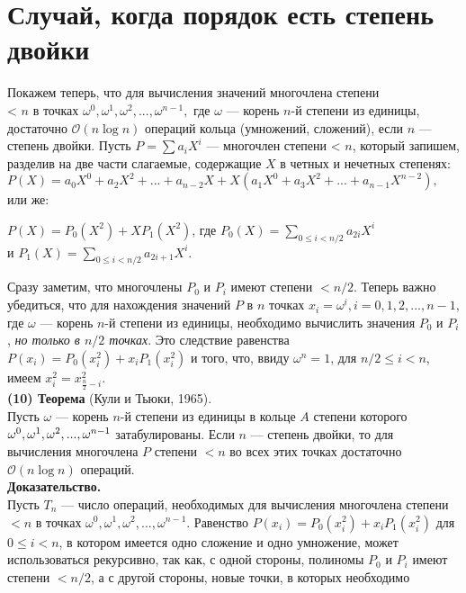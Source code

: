 \documentclass{mai_book}
\begin{document}
\section{ Случай, когда порядок есть степень двойки}
Покажем теперь, что для вычисления значений многочлена степени\\ < $n$
в точках $\omega^{0},\omega^{1},\omega^{2},...,\omega^{n-1},$ где $\omega$ — корень $n$-й степени из единицы,
достаточно $\mathcal{O}(n \log n)$ операций кольца (умножений, сложений), если $n$
— степень двойки. Пусть $P = \sum a_i X^i$ — многочлен степени < $n$, 
который запишем, разделив на две части слагаемые, содержащие $X$ в
четных и нечетных степенях:\smallskip\\
$P(X)=a_0X^0 + a_2X^2 +...+ a_{n-2}X + X(a_1X^0 + a_3X^2+...+a_{n-1}X^{n-2}),$\smallskip\\
или же:
\begin{center}
$P(X)=P_0(X^2)+XP_1(X^2)$, где $P_0(X) = \sum\limits_{0 \leq i < n/2} a_{2i} X^i$\smallskip\\
и $P_1(X) = \sum\limits_{0 \leq i < n/2} a_{2i+1} X^i.$
\end{center}\smallskip
Сразу заметим, что многочлены $P_0$ и $P_i$ имеют степени $<n/2$. Теперь
важно убедиться, что для нахождения значений $P$ в $n$ точках $x_i=\omega^i,
i = 0,1,2,...,n- 1$, где $\omega$ — корень $n$-й степени из единицы, необходимо
вычислить значения $P_0$ и $P_i$, \textit{но только в $n/2$ точках}. Это следствие
равенства $P(x_i)=P_0(x_{i}^2) + x_iP_1(x_i^2)$ и того, что, ввиду $\omega^n = 1$, для
$n/2 \leq i <n$, имеем $x_i^2 = x_{\frac{n}{2}-i}^2$.\smallskip\\
\textbf{(10) Теорема} (Кули и Тьюки, 1965).\\
Пусть $\omega$ — корень $n$-й степени из единицы в кольце $A$ степени 
которого  $\omega^0,\omega^1,\\\omega^2,...,\omega^{n-1}$ затабулированы. Если $n$ — степень двойки,
то для вычисления многочлена $P$ степени $<n$ во всех этих точках 
достаточно $\mathcal{O}(n \log n)$ операций.\smallskip\\
\textbf{Доказательство.}\\
Пусть $T_n$ — число операций, необходимых для вычисления 
многочлена степени $<n$ в точках $\omega^0,\omega^1,\omega^2,...,\omega^{n-1}$. Равенство
$P(x_i)=P_0(x_i^2)+x_iP_1(x_i^2)$ для $0 \leq i < n$, в котором имеется 
одно сложение и одно умножение, может использоваться рекурсивно,
так как, с одной стороны, полиномы $P_0$ и $P_i$ имеют степени $<n/2$,
а с другой стороны, новые точки, в которых необходимо 
\end{document}
